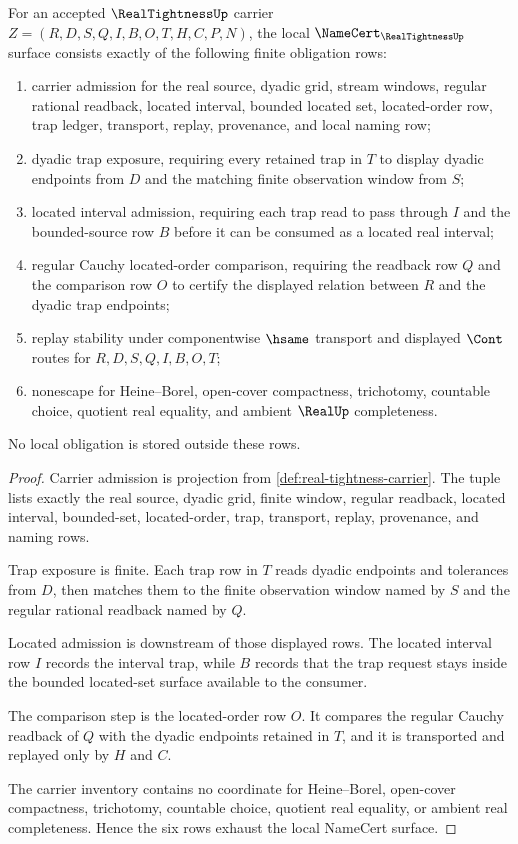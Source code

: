 \begin{theorem}
\label{thm:real-tightness-namecert-obligations}
For an accepted $\RealTightnessUp$ carrier $Z=(R,D,S,Q,I,B,O,T,H,C,P,N)$, the local $\NameCert_{\RealTightnessUp}$ surface consists exactly of the following finite obligation rows:
\begin{enumerate}
\item carrier admission for the real source, dyadic grid, stream windows, regular rational readback, located interval, bounded located set, located-order row, trap ledger, transport, replay, provenance, and local naming row;
\item dyadic trap exposure, requiring every retained trap in $T$ to display dyadic endpoints from $D$ and the matching finite observation window from $S$;
\item located interval admission, requiring each trap read to pass through $I$ and the bounded-source row $B$ before it can be consumed as a located real interval;
\item regular Cauchy located-order comparison, requiring the readback row $Q$ and the comparison row $O$ to certify the displayed relation between $R$ and the dyadic trap endpoints;
\item replay stability under componentwise $\hsame$ transport and displayed $\Cont$ routes for $R,D,S,Q,I,B,O,T$;
\item nonescape for Heine--Borel, open-cover compactness, trichotomy, countable choice, quotient real equality, and ambient $\RealUp$ completeness.
\end{enumerate}
No local obligation is stored outside these rows.
\end{theorem}
\begin{proof}
Carrier admission is projection from \autoref{def:real-tightness-carrier}. The tuple lists exactly the real source, dyadic grid, finite window, regular readback, located interval, bounded-set, located-order, trap, transport, replay, provenance, and naming rows.

Trap exposure is finite. Each trap row in $T$ reads dyadic endpoints and tolerances from $D$, then matches them to the finite observation window named by $S$ and the regular rational readback named by $Q$.

Located admission is downstream of those displayed rows. The located interval row $I$ records the interval trap, while $B$ records that the trap request stays inside the bounded located-set surface available to the consumer.

The comparison step is the located-order row $O$. It compares the regular Cauchy readback of $Q$ with the dyadic endpoints retained in $T$, and it is transported and replayed only by $H$ and $C$.

The carrier inventory contains no coordinate for Heine--Borel, open-cover compactness, trichotomy, countable choice, quotient real equality, or ambient real completeness. Hence the six rows exhaust the local NameCert surface.
\end{proof}

